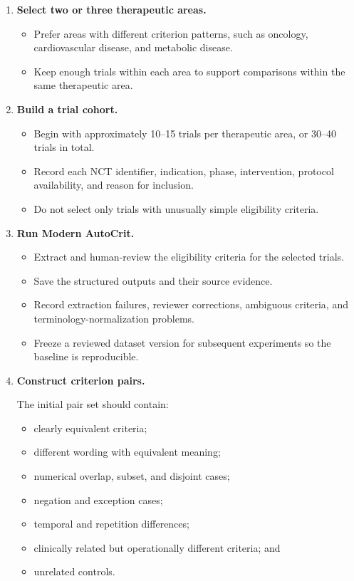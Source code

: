 \documentclass[11pt]{article}
\begin{document}
\begin{enumerate}
    \item \textbf{Select two or three therapeutic areas.}
    \begin{itemize}
        \item Prefer areas with different criterion patterns, such as oncology, cardiovascular disease, and metabolic disease.
        \item Keep enough trials within each area to support comparisons within the same therapeutic area.
    \end{itemize}

    \item \textbf{Build a trial cohort.}
    \begin{itemize}
        \item Begin with approximately 10--15 trials per therapeutic area, or 30--40 trials in total.
        \item Record each NCT identifier, indication, phase, intervention, protocol availability, and reason for inclusion.
        \item Do not select only trials with unusually simple eligibility criteria.
    \end{itemize}

    \item \textbf{Run Modern AutoCrit.}
    \begin{itemize}
        \item Extract and human-review the eligibility criteria for the selected trials.
        \item Save the structured outputs and their source evidence.
        \item Record extraction failures, reviewer corrections, ambiguous criteria, and terminology-normalization problems.
        \item Freeze a reviewed dataset version for subsequent experiments so the baseline is reproducible.
    \end{itemize}

    \item \textbf{Construct criterion pairs.}

    The initial pair set should contain:
    \begin{itemize}
        \item clearly equivalent criteria;
        \item different wording with equivalent meaning;
        \item numerical overlap, subset, and disjoint cases;
        \item negation and exception cases;
        \item temporal and repetition differences;
        \item clinically related but operationally different criteria; and
        \item unrelated controls.
    \end{itemize}


\end{enumerate}
\end{document}
